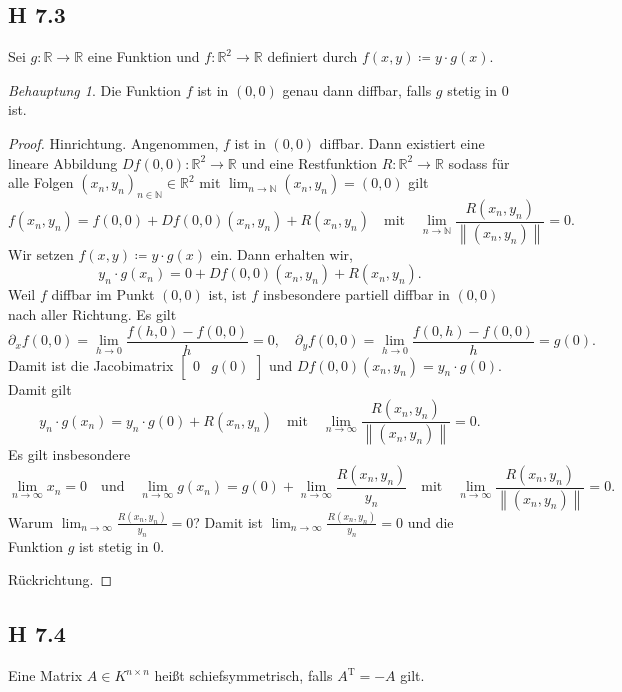 \documentclass[draft,a5paper]{article}
\theoremstyle{remark}
\newtheorem*{beh}{Behauptung}
\newcommand{\enVert}[1]{\left\lVert#1\right\rVert}
\let\norm=\enVert
\begin{document}
\subsection*{H 7.3}

Sei \(g\colon \mathbb{R} \to \mathbb{R}\) eine Funktion und \(f\colon \mathbb{R}^{2} \to \mathbb{R}\) definiert durch
\(f(x, y) \coloneq y \cdot g(x)\).

\begin{beh}
  Die Funktion \(f\) ist in \((0, 0)\) genau dann diffbar, falls \(g\)
  stetig in \(0\) ist.
\end{beh}

\begin{proof}
  Hinrichtung. Angenommen, \(f\) ist in \((0, 0)\) diffbar.  Dann
  existiert eine lineare Abbildung
  \(Df(0, 0)\colon \mathbb{R}^{2} \to \mathbb{R}\) und eine Restfunktion
  \(R\colon \mathbb{R}^{2} \to \mathbb{R}\) sodass für alle Folgen
  \((x_{n}, y_{n})_{n \in \mathbb{N}} \in \mathbb{R}^{2}\) mit
  \(\lim_{n \to \mathbb{N}}{(x_{n}, y_{n})} = (0, 0)\) gilt
  \[
    f(x_{n}, y_{n}) = f(0, 0) + Df(0, 0)(x_{n}, y_{n}) + R(x_{n},
    y_{n}) \quad \text{mit} \quad \lim_{n \to \mathbb{N}}{\frac{R(x_{n},
        y_{n})}{\norm{(x_{n}, y_{n})}}} = 0.
  \]
  Wir setzen \(f(x, y) \coloneq y \cdot g(x)\) ein.  Dann erhalten wir,
  \[
    y_{n} \cdot g(x_{n}) = 0 + Df(0, 0)(x_{n}, y_{n}) + R(x_{n}, y_{n}).
  \]
  Weil \(f\) diffbar im Punkt \((0, 0)\) ist, ist \(f\) insbesondere
  partiell diffbar in \((0, 0)\) nach aller Richtung.  Es gilt
  \[\partial_{x}f(0, 0) = \lim_{h \to 0}{\frac{f(h, 0) - f(0, 0)}{h}} = 0, \quad
    \partial_{y}f(0, 0) = \lim_{h \to 0}{\frac{f(0, h) - f(0, 0)}{h}} = g(0). \]
  Damit ist die Jacobimatrix \(
  \begin{bmatrix}
    0 & g(0)
  \end{bmatrix}
  \) und \(Df(0, 0)(x_{n}, y_{n}) = y_{n} \cdot g(0).\)
  Damit gilt
  \[
    y_{n} \cdot g(x_{n}) = y_{n} \cdot g(0) + R(x_{n}, y_{n}) \quad \text{mit} \quad
    \lim_{n \to \infty}{\frac{R(x_{n}, y_{n})}{\norm{(x_{n}, y_{n})}}} = 0.
  \]
  Es gilt insbesondere
  \[
    \lim_{n \to \infty}{x_{n}} = 0 \quad \text{und} \quad \lim_{n \to \infty}{g(x_{n})} =
    g(0) + \lim_{n \to \infty}{\frac{R(x_{n}, y_{n})}{y_{n}}} \quad \text{mit} \quad
    \lim_{n \to \infty}{\frac{R(x_{n}, y_{n})}{\norm{(x_{n}, y_{n})}}} = 0.
  \]
  {\Huge Warum \(\lim_{n \to \infty}{\frac{R(x_{n}, y_{n})}{y_{n}}} = 0\)?}
  Damit ist
  \(\lim_{n \to \infty}{\frac{R(x_{n}, y_{n})}{y_{n}}} = 0\) und die Funktion
  \(g\) ist stetig in \(0\).

  Rückrichtung.
\end{proof}

\subsection*{H 7.4}

Eine Matrix \(A \in K^{n \times n}\) heißt schiefsymmetrisch, falls
\(A^{\mathrm{T}} = -A\) gilt.
\end{document}
